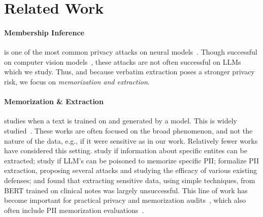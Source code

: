 \section{Related Work}
\paragraph{Membership Inference}
is one of the most common privacy attacks on neural models~\citep{shokri2017membership}. Though successful on computer vision models~\citep{yeom2018privacy,salem2018ml,sablayrolles2019white,choquette2021label,carlini2022membership,jagielski2024students}, these attacks are not often successful on LLMs~\citep{duan2024membership} which we study. Thus, and because verbatim extraction poses a stronger privacy risk, we focus on \emph{memorization and extraction}. 


\paragraph{Memorization \& Extraction}
studies when a text is trained on and generated by a model. This is widely studied~\citep{secretsharer,carlini-extraction, quantifying, lee-etal-2022-deduplicating, counterfactual, ippolito-etal-2023-preventing,biderman2023emergent, pythia, kudugunta2024madlad,nasr2023scalable, chang-etal-2023-speak, ozdayi-etal-2023-controlling, compression, decop, wang-etal-2024-unlocking}. These works are often focused on the broad phenomenon, and not the nature of the data, e.g., if it were sensitive as in our work. Relatively fewer works have considered this setting. \citet{huang-etal-2022-large} study if information about specific entites can be extracted; \citet{panda2024teach} study if LLM's can be poisoned to memorize specific PII; \citet{PII-leakage} formalize PII extraction, proposing several attacks and studying the efficacy of various existing defenses; and \citet{lehman-etal-2021-bert} found that extracting sensitive data, using simple techniques, from BERT trained on clinical notes was largely unsuccessful. This line of work has become important for practical privacy and memorization audits~\citep{anil2023palm,team2023gemini,dubey-2024-evaluating}, which also often include PII memorization evaluations~\citep{team2023gemini,team2024gemini,team2024gemma,team2024gemma2,team2024codegemma}. 
\vspace{-1em}

